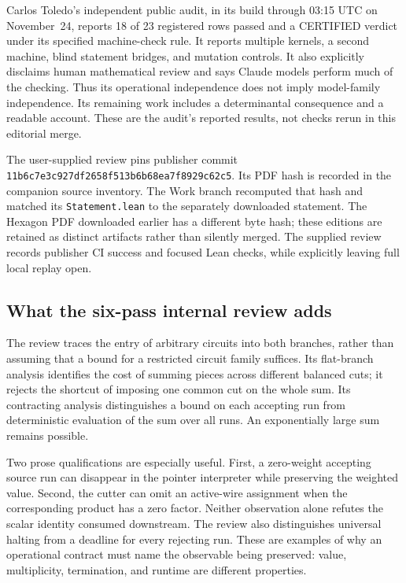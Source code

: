\documentclass[11pt,letterpaper]{article}
\begin{document}
Carlos Toledo's independent public audit, in its build through 03:15 UTC on November~24, reports 18 of 23 registered rows passed and a CERTIFIED verdict under its specified machine-check rule. It reports multiple kernels, a second machine, blind statement bridges, and mutation controls. It also explicitly disclaims human mathematical review and says Claude models perform much of the checking. Thus its operational independence does not imply model-family independence. Its remaining work includes a determinantal consequence and a readable account. These are the audit's reported results, not checks rerun in this editorial merge.\cite{toledo}

The user-supplied review pins publisher commit
\texttt{11b6c7e3c927df2658f513b6b68ea7f8929c62c5}. Its PDF hash is recorded in the companion source inventory. The Work branch recomputed that hash and matched its \texttt{Statement.lean} to the separately downloaded statement. The Hexagon PDF downloaded earlier has a different byte hash; these editions are retained as distinct artifacts rather than silently merged. The supplied review records publisher CI success and focused Lean checks, while explicitly leaving full local replay open.\cite{internalvp}

\subsection{What the six-pass internal review adds}
The review traces the entry of arbitrary circuits into both branches, rather than assuming that a bound for a restricted circuit family suffices. Its flat-branch analysis identifies the cost of summing pieces across different balanced cuts; it rejects the shortcut of imposing one common cut on the whole sum. Its contracting analysis distinguishes a bound on each accepting run from deterministic evaluation of the sum over all runs. An exponentially large sum remains possible.

Two prose qualifications are especially useful. First, a zero-weight accepting source run can disappear in the pointer interpreter while preserving the weighted value. Second, the cutter can omit an active-wire assignment when the corresponding product has a zero factor. Neither observation alone refutes the scalar identity consumed downstream. The review also distinguishes universal halting from a deadline for every rejecting run. These are examples of why an operational contract must name the observable being preserved: value, multiplicity, termination, and runtime are different properties.
\end{document}
